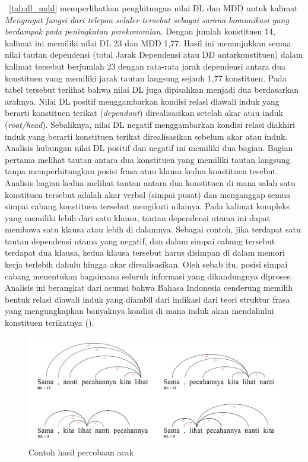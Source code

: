 \tab~\ref{tab:dl_mdd} memperlihatkan penghitungan nilai DL dan MDD untuk kalimat \textit{Mengingat fungsi dari telepon seluler tersebut sebagai sarana komunikasi yang berdampak pada peningkatan perekonomian}. Dengan jumlah konstituen 14, kalimat ini memiliki nilai DL 23 dan MDD 1,77. Hasil ini menunjukkan semua nilai tautan dependensi (total Jarak Dependensi atau DD antarkonstituen) dalam kalimat tersebut berjumlah 23 dengan rata-rata jarak dependensi antara dua konstituen yang memiliki jarak tautan langsung sejauh 1,77 konstituen. Pada tabel tersebut terlihat bahwa nilai DL juga dipisahkan menjadi dua berdasarkan arahnya. Nilai DL positif menggambarkan kondisi relasi diawali induk yang berarti konstituen terikat (\textit{dependant}) direalisasikan setelah akar atau induk (\textit{root/head}). Sebaliknya, nilai DL negatif menggambarkan kondisi relasi diakhiri induk yang berarti konstituen terikat direalisasikan sebelum akar atau induk. Analisis hubungan nilai DL positif dan negatif ini memiliki dua bagian. Bagian pertama melihat tautan antara dua konstituen yang memiliki tautan langsung tanpa memperhitungkan posisi frasa atau klausa kedua konstituen tesebut. Analisis bagian kedua melihat tautan antara dua konstituen di mana salah satu konstituen tersebut adalah akar verbal (simpai pusat) dan menganggap semua simpai cabang konstituen tersebut mengikuti nilainya. Pada kalimat kompleks yang memiliki lebih dari satu klausa, tautan dependensi utama ini dapat membawa satu klausa atau lebih di dalamnya. Sebagai contoh, jika terdapat satu tautan dependensi utama yang negatif, dan dalam simpai cabang tersebut terdapat dua klausa, kedua klausa tersebut harus disimpan di dalam memori kerja terlebih dahulu hingga akar direalisasikan. Oleh sebab itu, posisi simpai cabang menentukan bagaimana seluruh informasi yang dikandungnya diproses. Analisis ini berangkat dari asumsi bahwa Bahasa Indonesia cenderung memilih bentuk relasi diawali induk yang diambil dari indikasi dari teori struktur frasa yang mengungkapkan banyaknya kondisi di mana induk akan mendahului konstituen terikatnya (\citealp{kridalaksana2002struktur, sneddon2010indonesian}).

\begin{figure}
	\centering \includegraphics[width=0.8
	\textwidth] {pics/percobaan_acak.jpg} 
	\caption{Contoh hasil percobaan acak} 
\label{fig:percobaan_acak} 
\end{figure}

